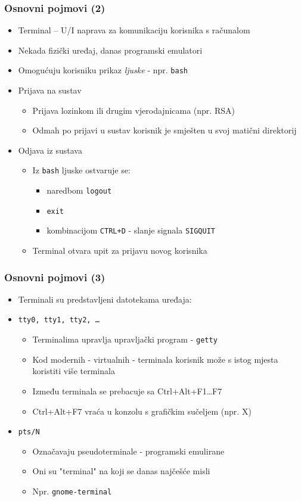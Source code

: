 \documentclass[table,usenames,dvipsnames] {beamer}
\newcommand{\shell}[1]{\texttt{#1}}
\begin{document}
\begin{frame}[t]
\frametitle{Osnovni pojmovi (2)}
\begin{itemize}
	\item Terminal -- U/I naprava za komunikaciju korisnika s računalom
	\item Nekada fizički uređaj, danas programski emulatori
	\item Omogućuju korisniku prikaz \textit{ljuske} - npr. \shell{bash}
  \item Prijava na sustav
  \begin{itemize}
  	\item Prijava lozinkom ili drugim vjerodajnicama (npr. RSA)
  	\item Odmah po prijavi u sustav korisnik je smješten u svoj matični direktorij
  \end{itemize}
  \item Odjava iz sustava
  \begin{itemize}
  	\item Iz \shell{bash} ljuske ostvaruje se:
    \begin{itemize}
      \item naredbom \shell{logout}
      \item \shell{exit} 
      \item kombinacijom \shell{CTRL+D} - slanje signala \shell{SIGQUIT}
    \end{itemize}
  	\item Terminal otvara upit za prijavu novog korisnika
  \end{itemize}
\end{itemize}
\end{frame}

\begin{frame}[t]
\frametitle{Osnovni pojmovi (3)}
  \begin{itemize}
  	\item Terminali su predstavljeni datotekama uređaja:
    \item[] \shell{tty0, tty1, tty2, \ldots}
    \begin{itemize}
    	\item Terminalima upravlja upravljački program - \shell{getty}
    	\item Kod modernih - virtualnih - terminala korisnik može s istog mjesta koristiti više terminala
	  \item Između terminala se prebacuje sa Ctrl+Alt+F1\ldots F7
    \item Ctrl+Alt+F7 vraća u konzolu s grafičkim sučeljem (npr. X)
    \end{itemize}
    \item[] \shell{pts/N}
    \begin{itemize}
      \item Označavaju pseudoterminale - programski emulirane
      \item Oni su "terminal" na koji se danas najčešće misli
      \item[] Npr. \shell{gnome-terminal}
    \end{itemize}
  \end{itemize}
\end{frame}
\end{document}
